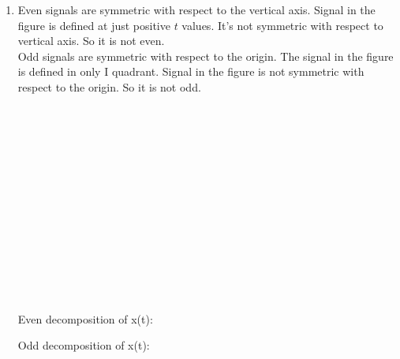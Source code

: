 \documentclass[10pt,a4paper, margin=1in]{article}
\begin{document}
\begin{enumerate}
\item %
    Even signals are symmetric with respect to the vertical axis. Signal in the figure is defined at just positive $t$ values. It's not symmetric with respect to vertical axis. So it is not even.\\
    Odd signals are symmetric with respect to the origin. The signal in the figure is defined in only I quadrant. Signal in the figure is not symmetric with respect to the origin. So it is not odd.\\ \\ \\ \\ \\ \\ \\ \\ \\ \\ \\ \\ \\ \\
    \\
    Even decomposition of x(t): \\
    
    \begin{figure}[h!]
    \centering
        
        \label{fig:q2}
    \end{figure}
    
    Odd decomposition of x(t):\\
    

\end{enumerate}
\end{document}
